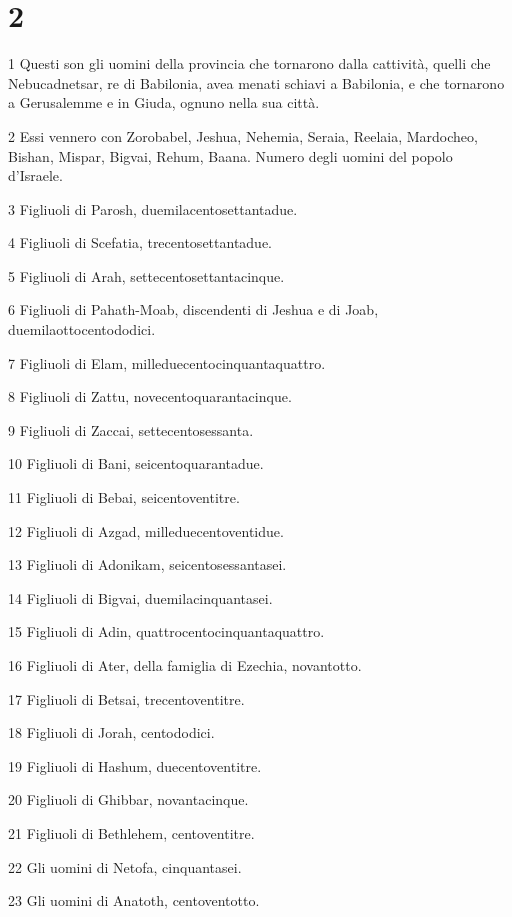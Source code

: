 \chapter{2}

\par 1 Questi son gli uomini della provincia che tornarono dalla cattività, quelli che Nebucadnetsar, re di Babilonia, avea menati schiavi a Babilonia, e che tornarono a Gerusalemme e in Giuda, ognuno nella sua città.
\par 2 Essi vennero con Zorobabel, Jeshua, Nehemia, Seraia, Reelaia, Mardocheo, Bishan, Mispar, Bigvai, Rehum, Baana. Numero degli uomini del popolo d'Israele.
\par 3 Figliuoli di Parosh, duemilacentosettantadue.
\par 4 Figliuoli di Scefatia, trecentosettantadue.
\par 5 Figliuoli di Arah, settecentosettantacinque.
\par 6 Figliuoli di Pahath-Moab, discendenti di Jeshua e di Joab, duemilaottocentododici.
\par 7 Figliuoli di Elam, milleduecentocinquantaquattro.
\par 8 Figliuoli di Zattu, novecentoquarantacinque.
\par 9 Figliuoli di Zaccai, settecentosessanta.
\par 10 Figliuoli di Bani, seicentoquarantadue.
\par 11 Figliuoli di Bebai, seicentoventitre.
\par 12 Figliuoli di Azgad, milleduecentoventidue.
\par 13 Figliuoli di Adonikam, seicentosessantasei.
\par 14 Figliuoli di Bigvai, duemilacinquantasei.
\par 15 Figliuoli di Adin, quattrocentocinquantaquattro.
\par 16 Figliuoli di Ater, della famiglia di Ezechia, novantotto.
\par 17 Figliuoli di Betsai, trecentoventitre.
\par 18 Figliuoli di Jorah, centododici.
\par 19 Figliuoli di Hashum, duecentoventitre.
\par 20 Figliuoli di Ghibbar, novantacinque.
\par 21 Figliuoli di Bethlehem, centoventitre.
\par 22 Gli uomini di Netofa, cinquantasei.
\par 23 Gli uomini di Anatoth, centoventotto.
